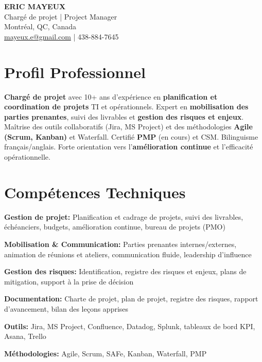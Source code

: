 \documentclass[11pt,a4paper]{article}
\begin{document}
\begin{center}
    {\LARGE \textbf{ERIC MAYEUX}}\\
    \vspace{4pt}
    {\large Chargé de projet | Project Manager}\\
    \vspace{4pt}
    Montréal, QC, Canada\\
    \href{mailto:mayeux.e@gmail.com}{mayeux.e@gmail.com} | 438-884-7645
\end{center}

\vspace{8pt}

\section*{Profil Professionnel}
\noindent
\textbf{Chargé de projet} avec 10+ ans d'expérience en \textbf{planification et coordination de projets} TI et opérationnels. Expert en \textbf{mobilisation des parties prenantes}, suivi des livrables et \textbf{gestion des risques et enjeux}. Maîtrise des outils collaboratifs (Jira, MS Project) et des méthodologies \textbf{Agile (Scrum, Kanban)} et Waterfall. Certifié \textbf{PMP} (en cours) et CSM. Bilinguisme français/anglais. Forte orientation vers l'\textbf{amélioration continue} et l'efficacité opérationnelle.

\section*{Compétences Techniques}

\textbf{Gestion de projet:} Planification et cadrage de projets, suivi des livrables, échéanciers, budgets, amélioration continue, bureau de projets (PMO)

\textbf{Mobilisation \& Communication:} Parties prenantes internes/externes, animation de réunions et ateliers, communication fluide, leadership d'influence

\textbf{Gestion des risques:} Identification, registre des risques et enjeux, plans de mitigation, support à la prise de décision

\textbf{Documentation:} Charte de projet, plan de projet, registre des risques, rapport d'avancement, bilan des leçons apprises

\textbf{Outils:} Jira, MS Project, Confluence, Datadog, Splunk, tableaux de bord KPI, Asana, Trello

\textbf{Méthodologies:} Agile, Scrum, SAFe, Kanban, Waterfall, PMP
\end{document}
